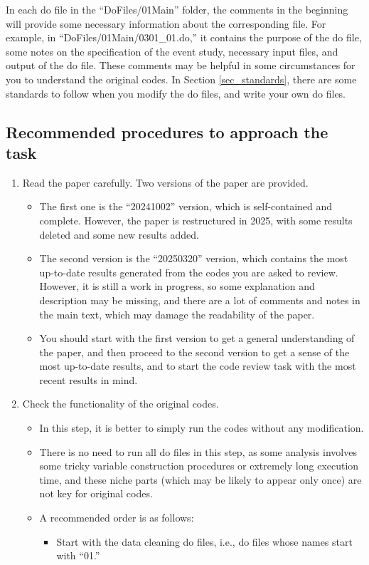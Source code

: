 \documentclass[12pt]{article}
\theoremstyle{definition}
\begin{document}
In each do file in the ``DoFiles/01Main'' folder, the comments in the beginning will provide some necessary information about the corresponding file. For example, in ``DoFiles/01Main/0301\_01.do,'' it contains the purpose of the do file, some notes on the specification of the event study, necessary input files, and output of the do file. These comments may be helpful in some circumstances for you to understand the original codes. In Section \ref{sec_standards}, there are some standards to follow when you modify the do files, and write your own do files.

\subsection{Recommended procedures to approach the task}

\begin{enumerate}[topsep=0pt, leftmargin=20pt, itemsep=0pt, label=(\arabic*)]
	\setlength{\parskip}{10pt} 
	\item Read the paper carefully. Two versions of the paper are provided. 
	\begin{itemize}[topsep=0pt, leftmargin=20pt, itemsep=0pt]
        \setlength{\parskip}{10pt} 
        \item The first one is the ``20241002'' version, which is self-contained and complete. However, the paper is restructured in 2025, with some results deleted and some new results added. 
        \item The second version is the ``20250320'' version, which contains the most up-to-date results generated from the codes you are asked to review. However, it is still a work in progress, so some explanation and description may be missing, and there are a lot of comments and notes in the main text, which may damage the readability of the paper.
        \item You should start with the first version to get a general understanding of the paper, and then proceed to the second version to get a sense of the most up-to-date results, and to start the code review task with the most recent results in mind.
    \end{itemize}
	\item Check the functionality of the original codes.
	\begin{itemize}[topsep=0pt, leftmargin=22pt, itemsep=0pt]
        \setlength{\parskip}{10pt} 
        \item In this step, it is better to simply run the codes without any modification.
        \item There is no need to run all do files in this step, as some analysis involves some tricky variable construction procedures or extremely long execution time, and these niche parts (which may be likely to appear only once) are not key for original codes.
        \item A recommended order is as follows:
        \begin{itemize}[topsep=0pt, leftmargin=20pt, itemsep=0pt]
            \setlength{\parskip}{10pt} 
            \item Start with the data cleaning do files, i.e., do files whose names start with ``01.'' 
            

\end{itemize}
\end{itemize}
\end{enumerate}
\end{document}
